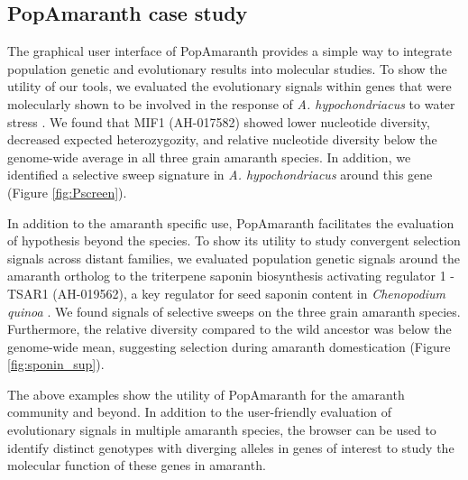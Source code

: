 \documentclass[9pt,twocolumn,twoside]{celabRxiv}
\begin{document}
\subsection{PopAmaranth case study}
The graphical user interface of PopAmaranth provides a simple way to integrate population genetic and evolutionary results into molecular studies. 
To show the utility of our tools, we evaluated the evolutionary signals within genes that were molecularly shown to be involved in the response of \textit{A. hypochondriacus} to water stress \citep{huerta2011water}. 
We found that MIF1 (AH-017582) showed lower nucleotide diversity, decreased expected heterozygozity, and relative nucleotide diversity below the genome-wide average in all three grain amaranth species. 
In addition, we identified a selective sweep signature in \textit{A. hypochondriacus} around this gene (Figure \ref{fig:Pscreen}). 

In addition to the amaranth specific use, PopAmaranth facilitates the evaluation of hypothesis beyond the species.
To show its utility to study convergent selection signals across distant families, we evaluated population genetic signals around the amaranth ortholog to the triterpene saponin biosynthesis activating regulator 1 - TSAR1 (AH-019562), a key regulator for seed saponin content in \textit{Chenopodium quinoa} \citep{jarvis2017genome}.
We found signals of selective sweeps on the three grain amaranth species. 
Furthermore, the relative diversity compared to the wild ancestor was below the genome-wide mean, suggesting selection during amaranth domestication (Figure \ref{fig:sponin_sup}).

The above examples show the utility of PopAmaranth for the amaranth community and beyond. 
In addition to the user-friendly evaluation of evolutionary signals in multiple amaranth species, the browser can be used to identify distinct genotypes with diverging alleles in genes of interest to study the molecular function of these genes in amaranth.
\end{document}
